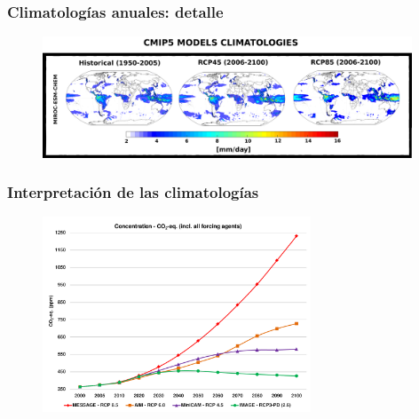 \documentclass{beamer}
\newtheorem{Th1}{Reseña Historica}
\begin{document}
		\begin{frame}
			\frametitle{Climatologías anuales: detalle}
			\begin{figure}[!hbt]
		   		\centering
		   		\includegraphics[width=11cm]{detalle-graficas.png}
			\end{figure}
		\end{frame}
		
		\begin{frame}
			\frametitle{Interpretación de las climatologías}
			\begin{figure}[!h]
				\centering
				\includegraphics[width=8cm]{CO2-concentration.png}
			\end{figure}
		\end{frame}
\end{document}
